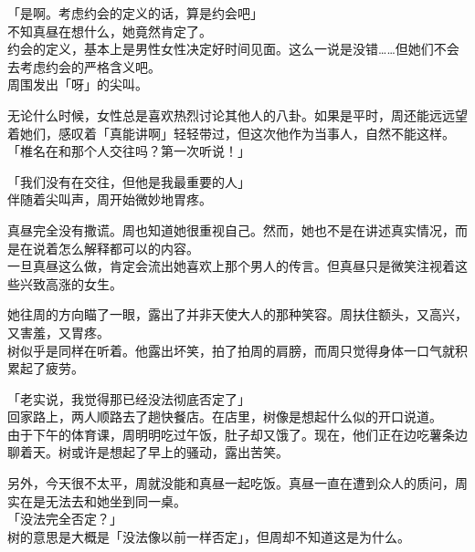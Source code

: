 「是啊。考虑约会的定义的话，算是约会吧」\\

不知真昼在想什么，她竟然肯定了。\\

约会的定义，基本上是男性女性决定好时间见面。这么一说是没错……但她们不会去考虑约会的严格含义吧。\\

周围发出「呀」的尖叫。

无论什么时候，女性总是喜欢热烈讨论其他人的八卦。如果是平时，周还能远远望着她们，感叹着「真能讲啊」轻轻带过，但这次他作为当事人，自然不能这样。\\

「椎名在和那个人交往吗？第一次听说！」

「我们没有在交往，但他是我最重要的人」\\

伴随着尖叫声，周开始微妙地胃疼。

真昼完全没有撒谎。周也知道她很重视自己。然而，她也不是在讲述真实情况，而是在说着怎么解释都可以的内容。\\

一旦真昼这么做，肯定会流出她喜欢上那个男人的传言。但真昼只是微笑注视着这些兴致高涨的女生。

她往周的方向瞄了一眼，露出了并非天使大人的那种笑容。周扶住额头，又高兴，又害羞，又胃疼。\\

树似乎是同样在听着。他露出坏笑，拍了拍周的肩膀，而周只觉得身体一口气就积累起了疲劳。\\

\vspace{2\baselineskip}

「老实说，我觉得那已经没法彻底否定了」\\

回家路上，两人顺路去了趟快餐店。在店里，树像是想起什么似的开口说道。\\

由于下午的体育课，周明明吃过午饭，肚子却又饿了。现在，他们正在边吃薯条边聊着天。树或许是想起了早上的骚动，露出苦笑。

另外，今天很不太平，周就没能和真昼一起吃饭。真昼一直在遭到众人的质问，周实在是无法去和她坐到同一桌。\\

「没法完全否定？」\\

树的意思是大概是「没法像以前一样否定」，但周却不知道这是为什么。\\

